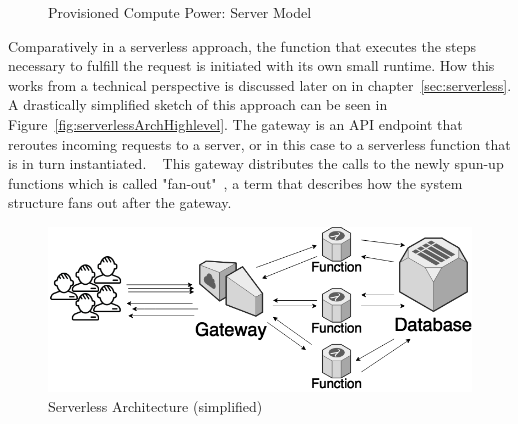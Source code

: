 \begin{figure}[ht]
    \centering
    \caption {Provisioned Compute Power: Server Model}
    \label{graph:provisionedComputePowerServer}
\end{figure}

Comparatively in a serverless approach, the function that executes the steps necessary to fulfill the request is initiated with its own small runtime. How this works from a technical perspective is discussed later on in chapter~\vref{sec:serverless}. A drastically simplified sketch of this approach can be seen in Figure~\vref{fig:serverlessArchHighlevel}. The gateway is an API endpoint that reroutes incoming requests to a server, or in this case to a serverless function that is in turn instantiated. ~ This gateway distributes the calls to the newly spun-up functions which is called "fan-out"~, a term that describes how the system structure fans out after the gateway.

\begin{figure}[ht]
    \includegraphics[width=\linewidth]{images/drawio/lambda.png}\centering
    \caption {Serverless Architecture (simplified)}
    \label{fig:serverlessArchHighlevel}
\end{figure}

